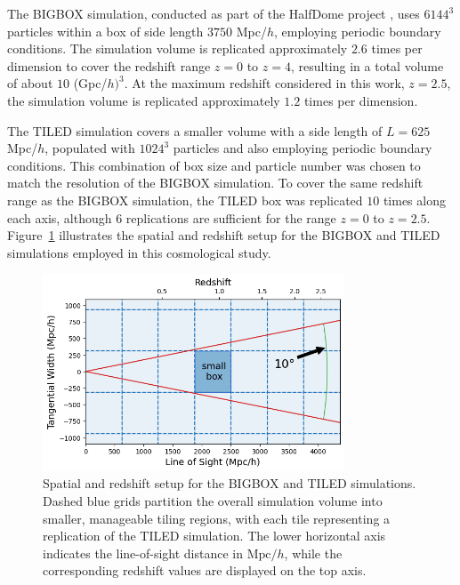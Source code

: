The BIGBOX simulation, conducted as part of the HalfDome project \citep{2024arXiv240717462B}, uses $6144^3$ particles within a box of side length $3750$ Mpc/$h$, employing periodic boundary conditions. The simulation volume is replicated approximately $2.6$ times per dimension to cover the redshift range $z = 0$ to $z = 4$, resulting in a total volume of about $10$ (Gpc/$h)^3$. At the maximum redshift considered in this work, $z = 2.5$, the simulation volume is replicated approximately $1.2$ times per dimension.

The TILED simulation covers a smaller volume with a side length of $L = 625$ Mpc/$h$, populated with $1024^3$ particles and also employing periodic boundary conditions. This combination of box size and particle number was chosen to match the resolution of the BIGBOX simulation. To cover the same redshift range as the BIGBOX simulation, the TILED box was replicated $10$ times along each axis, although $6$ replications are sufficient for the range $z = 0$ to $z = 2.5$. Figure~\ref{fig:simulationsetting} illustrates the spatial and redshift setup for the BIGBOX and TILED simulations employed in this cosmological study.

\begin{figure}[ht]
    \centering
    \includegraphics[width=0.8\textwidth]{figures/light_cone_configuration.png}
    \caption[Spatial and redshift setup for the BIGBOX and TILED simulations]{Spatial and redshift setup for the BIGBOX and TILED simulations. Dashed blue grids partition the overall simulation volume into smaller, manageable tiling regions, with each tile representing a replication of the TILED simulation. The lower horizontal axis indicates the line-of-sight distance in $\mathrm{Mpc}/h$, while the corresponding redshift values are displayed on the top axis.} \label{fig:simulationsetting}
\end{figure}


